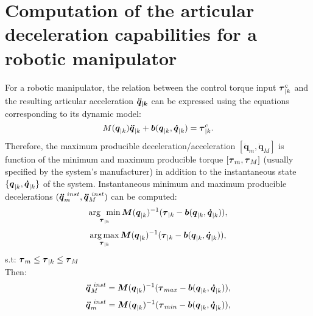 
\chapter[Appendix]{Computation of the articular deceleration capabilities for a robotic manipulator}
\label{app:constrcomp}
For a robotic manipulator, the relation between the control torque input $\mbox{\boldmath${\tau}$}_{|k}^c$ and the resulting articular acceleration $\mbox{\boldmath${\ddot{q}_{|k}}$}$ can be expressed using the equations corresponding to its dynamic model: 
\begin{equation}
M(\mbox{\boldmath${q}$}_{|k}) \mbox{\boldmath${\ddot{q}}$}_{|k} + \mbox{\boldmath${b}$}(\mbox{\boldmath${q}$}_{|k},\mbox{\boldmath${\dot{q}}$}_{|k}) = \mbox{\boldmath${\tau}$}_{|k}^c.
\label{eq:dyn_eq_bis}
\end{equation}
Therefore, the maximum producible deceleration/acceleration $[\boldsymbol{\ddot{q}}_m, \boldsymbol{\ddot{q}}_M]$ is function of the minimum and maximum producible torque $[\mbox{\boldmath${\tau}$}_m, \mbox{\boldmath${\tau}$}_M]$ (usually specified by the system's manufacturer) in addition to the instantaneous state $\{\mbox{\boldmath${q}$}_{|k},\mbox{\boldmath${\dot{q}}$}_{|k}\}$ of the system. Instantaneous  minimum and maximum producible decelerations $(\mbox{\boldmath${\ddot{q}}$}_{m}^{~inst}, \mbox{\boldmath${\ddot{q}}$}_{M}^{~inst})$ can be computed:
\begin{gather}
\argmin \limits_{\boldsymbol{\tau}_{|k}} \boldsymbol{M}(\vect{q}_{|k})^{-1} (\vect{\tau}_{|k}-\vect{b}(\vect{q}_{|k},\vect{\dot{q}}_{|k})),
\raisetag{-.5em}
\label{eq:qddot_minimizing_opt_1}
\end{gather}
\begin{gather}
\argmax \limits_{\boldsymbol{\tau}_{|k}} \boldsymbol{M}(\vect{q}_{|k})^{-1} (\vect{\tau}_{|k}-\vect{b}(\vect{q}_{|k},\vect{\dot{q}}_{|k})),
\raisetag{-.5em}
\label{eq:qddot_maximizing_opt_2}
\end{gather}
s.t: $\mbox{\boldmath${\tau}$}_m \leq \mbox{\boldmath${\tau}$}_{|k} \leq \mbox{\boldmath${\tau}$}_M$ \\
Then: 
\begin{equation}
\mbox{\boldmath${\ddot{q}}$}_{M}^{~inst} =  \boldsymbol{M}(\mbox{\boldmath${q}$}_{|k})^{-1} (\mbox{\boldmath${\tau}$}_{max}-\mbox{\boldmath${b}$}(\mbox{\boldmath${q}$}_{|k},\mbox{\boldmath${\dot{q}}$}_{|k})), 
\label{eq:qddot_maximizing}
\end{equation}
\begin{equation}
\mbox{\boldmath${\ddot{q}}$}_{m}^{~inst} =  \boldsymbol{M}(\mbox{\boldmath${q}$}_{|k})^{-1} (\mbox{\boldmath${\tau}$}_{min}-\mbox{\boldmath${b}$}(\mbox{\boldmath${q}$}_{|k},\mbox{\boldmath${\dot{q}}$}_{|k})), 
\label{eq:qddot_minimizing}
\end{equation}
